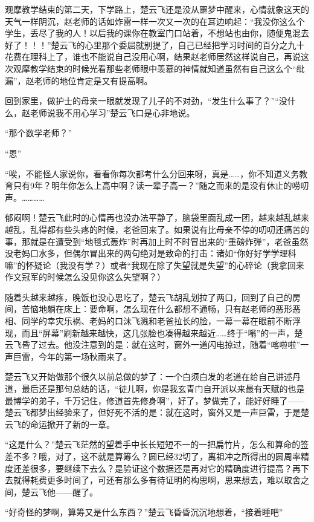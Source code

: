 观摩教学结束的第二天，下学路上，楚云飞还是没从噩梦中醒来，心情就象这天的天气一样阴沉，赵老师的话如炸雷一样一次又一次的在耳边响起：“我没你这么个学生，丢尽了我的人！以后我的课你在教室门口站着，不想站也由你，随便鬼混去好了！！！”楚云飞的心里那个委屈就别提了，自己已经把学习时间的百分之九十花费在理科上了，谁也不能说自己没用心啊，结果赵老师居然这样说自己，再说这次观摩教学结束的时候光看那些老师眼中羡慕的神情就知道虽然有自己这么个“纰漏”，赵老师的地位肯定是又有提高啊。

回到家里，做护士的母亲一眼就发现了儿子的不对劲，“发生什么事了？”“没什么，赵老师说我不用心学习”楚云飞口是心非地说。

“那个数学老师？”

“恩”

“唉，不能怪人家说你，看看你每次都考什么分回来呀，真是……，你不知道义务教育只有9年？明年你怎么上高中啊？读一辈子高一？”随之而来的是没有休止的唠叨声。…………

郁闷啊！楚云飞此时的心情再也没办法平静了，脑袋里面乱成一团，越来越乱越来越乱，乱得都有些头疼的时候，老爸回来了。如果说有比母亲不停的叨叨还痛苦的事，那就是在遭受到“地毯式轰炸”时再加上时不时冒出来的“重磅炸弹”，老爸虽然没老妈口水多，但偶尔冒出来的两句绝对是致命的打击：诸如“你好好学学理科嘛”的怀疑论（我没有学？）或者“我现在除了失望就是失望”的心碎论（我拿回来作文冠军的时候怎么没见你这么失望啊？）

随着头越来越疼，晚饭也没心思吃了，楚云飞胡乱划拉了两口，回到了自己的房间，苦恼地躺在床上：要命啊，怎么现在什么都想不通畅，只有赵老师的恶形恶相、同学的幸灾乐祸、老妈的口沫飞溅和老爸拉长的脸，一幕一幕在眼前不断浮现，而且“屏幕”刷新越来越快，这几张脸也凑得越来越近……终于“嗡”的一声，楚云飞昏了过去。他没注意到的是：就在这时，窗外一道闪电掠过，随着“喀啦啦”一声巨雷，今年的第一场秋雨来了。

楚云飞又开始做那个很久以前总做的梦了：一个白须白发的老道在给自己讲述丹道，最后还是那句总结的话，“徒儿啊，你是我玄青门自开派以来最有天赋的也是最博学的弟子，千万记住，修道首先修身啊”，好了，梦做完了，能好好睡了——楚云飞都梦出经验来了，但好死不活的是：就在这时，窗外又是一声巨雷，于是楚云飞的命运掀开了新的一章。

“这是什么？”楚云飞茫然的望着手中长长短短不一的一把扁竹片，怎么和算命的签差不多？哦，对了，这不就是算筹么？圆已经32切了，离祖冲之所得出的圆周率精度还差很多，要继续下去么？是验证这个数据还是再对它的精确度进行提高？再下去就得耗费更多时间了，可还有那么多有待证明的构思啊，思来想去，难以取舍之间，楚云飞他——醒了。

“好奇怪的梦啊，算筹又是什么东西？”楚云飞昏昏沉沉地想着，“接着睡吧”

